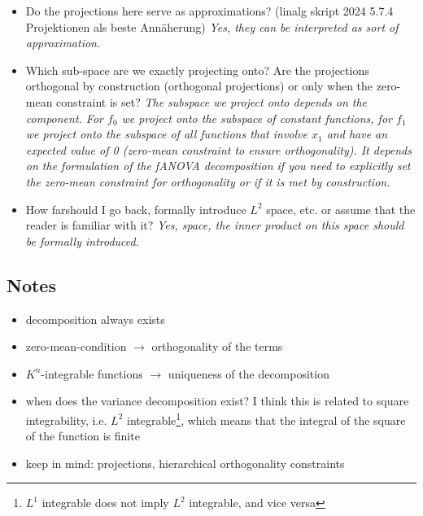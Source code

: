 \begin{itemize}
    \item Do the projections here serve as approximations? (linalg skript 2024 5.7.4 Projektionen als beste Annäherung) \textit{Yes, they can be interpreted as sort of approximation.}
    \item Which sub-space are we exactly projecting onto? Are the projections orthogonal by construction (orthogonal projections) or only when the zero-mean constraint is set? \textit{The subspace we project onto depends on the component. For $f_0$ we project onto the subspace of constant functions, for $f_1$ we project onto the subspace of all functions that involve $x_1$ and have an expected value of 0 (zero-mean constraint to ensure orthogonality). It depends on the formulation of the fANOVA decomposition if you need to explicitly set the zero-mean constraint for orthogonality or if it is met by construction.}
    \item How \ldq far\rdq should I go back, formally introduce $L^2$ space, etc. or assume that the reader is familiar with it? \textit{Yes, space, the inner product on this space should be formally introduced.}
\end{itemize}


\subsection*{Notes}
\begin{itemize}
    \item decomposition always exists
    \item zero-mean-condition $\rightarrow$ orthogonality of the terms
    \item $K^n$-integrable functions $\rightarrow$ uniqueness of the decomposition
    \item when does the variance decomposition exist? I think this is related to square integrability, i.e. $L^2$ integrable\footnote{$L^1$ integrable does not imply $L^2$ integrable, and vice versa}, which means that the integral of the square of the function is finite
    \item keep in mind: projections, hierarchical orthogonality constraints
\end{itemize}











